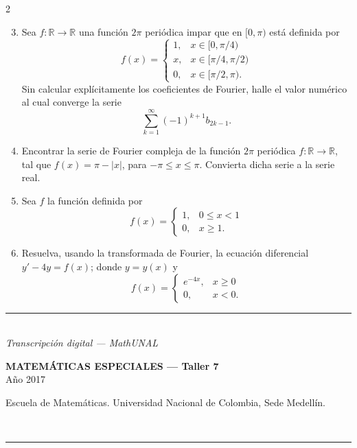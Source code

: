 \documentclass[11pt]{article}
\newcommand{\examheader}[2]{%
  \noindent
  \begin{minipage}[t]{0.6\linewidth}
    {\small\bfseries MATEM\'ATICAS ESPECIALES --- #1}\\
    {\small #2}
  \end{minipage}%
  \hfill
  \begin{minipage}[t]{0.35\linewidth}
    \raggedleft\small Escuela de Matem\'aticas. Universidad Nacional de Colombia, Sede Medell\'in.
  \end{minipage}\\[2pt]
  \rule{\linewidth}{0.6pt}
}
\newcommand{\examfooter}{%
  \vfill
  \rule{\linewidth}{0.4pt}\\[1pt]
  {\scriptsize\textit{Transcripci\'on digital --- MathUNAL}\hfill\textcolor{unalblue}{\textbf{\thepage}}}
}
\begin{document}
\begin{multicols}{2}
\begin{enumerate}
\setcounter{enumi}{2}
\item Sea $f:\mathbb{R}\to\mathbb{R}$ una función $2\pi$ periódica impar que en $[0,\pi)$ está definida por
\[
f(x) = \begin{cases} 1, & x \in [0,\pi/4) \\ x, & x \in [\pi/4,\pi/2) \\ 0, & x \in [\pi/2,\pi). \end{cases}
\]
Sin calcular explícitamente los coeficientes de Fourier, halle el valor numérico al cual converge la serie
\[
\sum_{k=1}^{\infty} (-1)^{k+1} b_{2k-1}.
\]

\item Encontrar la serie de Fourier compleja de la función $2\pi$ periódica $f:\mathbb{R}\to\mathbb{R}$, tal que $f(x) = \pi - |x|$, para $-\pi \le x \le \pi$. Convierta dicha serie a la serie real.

\item Sea $f$ la función definida por
\[
f(x) = \begin{cases} 1, & 0 \le x < 1 \\ 0, & x \ge 1. \end{cases}
\]

\item Resuelva, usando la transformada de Fourier, la ecuación diferencial $y' - 4y = f(x)$; donde $y=y(x)$ y
\[
f(x) = \begin{cases} e^{-4x}, & x \ge 0 \\ 0, & x < 0. \end{cases}
\]
\end{enumerate}
\end{multicols}

\examfooter
\newpage

\examheader{Taller 7}{A\~no 2017}
\end{document}
